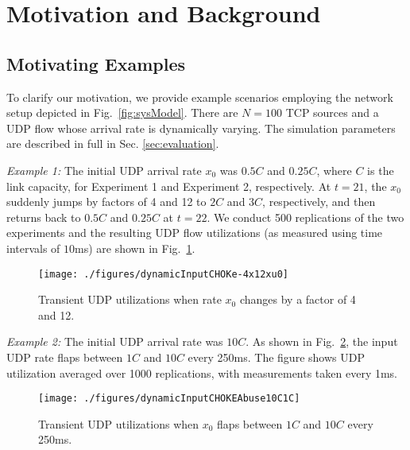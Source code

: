 \documentclass{IEEEtran}
\begin{document}
\section{Motivation and Background}\label{sec:motivationBackgnd}
    \subsection{Motivating Examples}\label{subsec:motivation}
To clarify our motivation, we provide example scenarios employing the network setup depicted in Fig.~\ref{fig:sysModel}. There are $N=100$ TCP sources and a UDP flow whose arrival rate is dynamically varying. The simulation parameters are described in full in Sec. \ref{sec:evaluation}.

    \emph{Example 1: }
The initial UDP arrival rate $x_0$ was $0.5C$ and $0.25C$, where $C$ is the link capacity, for Experiment 1 and Experiment 2, respectively. At $t=21$, the $x_0$ suddenly jumps by factors of 4 and 12 to $2C$ and $3C$, respectively, and then returns back to $0.5C$ and $0.25C$ at $t=22$. We conduct 500 replications of the two experiments and the resulting UDP flow utilizations (as measured using time intervals of $10$ms) are shown in Fig.~\ref {fig:4x12xUtil}.
      \begin{figure}[h]\centering
           \texttt{[image: ./figures/dynamicInputCHOKe-4x12xu0]}
\caption{Transient UDP utilizations when rate $x_0$ changes by a factor of 4 and 12.}
        \label{fig:4x12xUtil}\end{figure}

   \emph{Example 2: }
The initial UDP arrival rate was $10C$. As shown in Fig.~\ref{fig:x0flap1C10C}, the input UDP rate flaps between $1C$ and $10C$ every 250ms. The figure shows UDP utilization averaged over 1000 replications, with measurements taken every 1ms. 
      \begin{figure}[h]\centering
        \texttt{[image: ./figures/dynamicInputCHOKEAbuse10C1C]}
        \caption{Transient UDP utilizations when $x_0$ flaps between $1C$ and $10C$ every 250ms.}
        \label{fig:x0flap1C10C} \end{figure}
\end{document}

